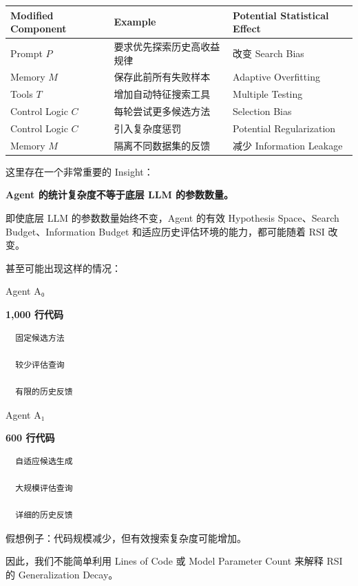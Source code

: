 \begin{readertable}
\begin{longtable}[]{@{}
  >{\raggedright\arraybackslash}p{}
  >{\raggedright\arraybackslash}p{}
  >{\raggedright\arraybackslash}p{}@{}}
\toprule
Modified Component & Example & Potential Statistical Effect \\
\midrule
\endhead
Prompt \(P\) & 要求优先探索历史高收益规律 & 改变 Search Bias \\
Memory \(M\) & 保存此前所有失败样本 & Adaptive Overfitting \\
Tools \(T\) & 增加自动特征搜索工具 & Multiple Testing \\
Control Logic \(C\) & 每轮尝试更多候选方法 & Selection Bias \\
Control Logic \(C\) & 引入复杂度惩罚 & Potential Regularization \\
Memory \(M\) & 隔离不同数据集的反馈 & 减少 Information Leakage \\
\bottomrule
\end{longtable}
\end{readertable}

这里存在一个非常重要的 Insight：

\textbf{Agent 的统计复杂度不等于底层 LLM 的参数数量。}

即使底层 LLM 的参数数量始终不变，Agent 的有效 Hypothesis Space、Search Budget、Information Budget 和适应历史评估环境的能力，都可能随着 RSI 改变。

甚至可能出现这样的情况：

Agent A₀

\textbf{1,000 行代码}

\begin{verbatim}
  固定候选方法

  较少评估查询

  有限的历史反馈
\end{verbatim}

Agent A₁

\textbf{600 行代码}

\begin{verbatim}
  自适应候选生成

  大规模评估查询

  详细的历史反馈
\end{verbatim}

假想例子：代码规模减少，但有效搜索复杂度可能增加。

因此，我们不能简单利用 Lines of Code 或 Model Parameter Count 来解释 RSI 的 Generalization Decay。

